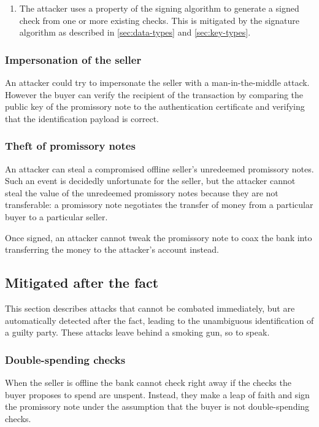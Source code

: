\documentclass[12pt,a4paper]{article}
\begin{document}
\begin{multicols}{2}
\begin{enumerate}
		\item The attacker uses a property of the signing algorithm to generate a signed check from one or more existing checks. This is mitigated by the signature algorithm as described in \autoref{sec:data-types} and \autoref{sec:key-types}.
	\end{enumerate}

	\subsubsection{Impersonation of the seller}
	
	An attacker could try to impersonate the seller with a man-in-the-middle attack. However the buyer can verify the recipient of the transaction by comparing the public key of the promissory note to the authentication certificate and verifying that the identification payload is correct. 
	
	\subsubsection{Theft of promissory notes}

	An attacker can steal a compromised offline seller's unredeemed promissory notes. Such an event is decidedly unfortunate for the seller, but the attacker cannot steal the value of the unredeemed promissory notes because they are not transferable: a promissory note negotiates the transfer of money from a particular buyer to a particular seller. 

	Once signed, an attacker cannot tweak the promissory note to coax the bank into transferring the money to the attacker's account instead.

	\subsection{Mitigated after the fact}

	This section describes attacks that cannot be combated immediately, but are automatically detected after the fact, leading to the unambiguous identification of a guilty party. These attacks leave behind a smoking gun, so to speak.

	\subsubsection{Double-spending checks}
	\label{sec:double-spending-checks}

	When the seller is offline the bank cannot check right away if the checks the buyer proposes to spend are unspent. Instead, they make a leap of faith and sign the promissory note under the assumption that the buyer is not double-spending checks.


\end{multicols}
\end{document}
